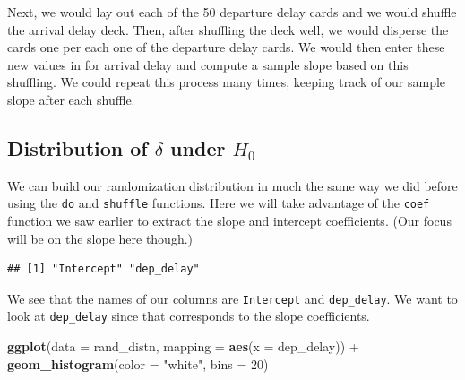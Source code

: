 \documentclass[]{tufte-book}
\newenvironment{Shaded}{\begin{snugshade}}{\end{snugshade}}
\newcommand{\KeywordTok}[1]{\textcolor[rgb]{0.13,0.29,0.53}{\textbf{{#1}}}}
\newcommand{\DataTypeTok}[1]{\textcolor[rgb]{0.13,0.29,0.53}{{#1}}}
\newcommand{\DecValTok}[1]{\textcolor[rgb]{0.00,0.00,0.81}{{#1}}}
\newcommand{\StringTok}[1]{\textcolor[rgb]{0.31,0.60,0.02}{{#1}}}
\newcommand{\NormalTok}[1]{{#1}}
\begin{document}
Next, we would lay out each of the 50 departure delay cards and we would
shuffle the arrival delay deck. Then, after shuffling the deck well, we
would disperse the cards one per each one of the departure delay cards.
We would then enter these new values in for arrival delay and compute a
sample slope based on this shuffling. We could repeat this process many
times, keeping track of our sample slope after each shuffle.

\subsection{\texorpdfstring{Distribution of \(\delta\) under
\(H_0\)}{Distribution of \textbackslash{}delta under H\_0}}\label{distribution-of-delta-under-h_0-2}

We can build our randomization distribution in much the same way we did
before using the \texttt{do} and \texttt{shuffle} functions. Here we
will take advantage of the \texttt{coef} function we saw earlier to
extract the slope and intercept coefficients. (Our focus will be on the
slope here though.)

\begin{Shaded}
\end{Shaded}

\begin{verbatim}
## [1] "Intercept" "dep_delay"
\end{verbatim}

We see that the names of our columns are \texttt{Intercept} and
\texttt{dep\_delay}. We want to look at \texttt{dep\_delay} since that
corresponds to the slope coefficients.

\begin{Shaded}
\begin{Highlighting}[]
\KeywordTok{ggplot}\NormalTok{(}\DataTypeTok{data =} \NormalTok{rand_distn, }\DataTypeTok{mapping =} \KeywordTok{aes}\NormalTok{(}\DataTypeTok{x =} \NormalTok{dep_delay)) +}
\StringTok{  }\KeywordTok{geom_histogram}\NormalTok{(}\DataTypeTok{color =} \StringTok{"white"}\NormalTok{, }\DataTypeTok{bins =} \DecValTok{20}\NormalTok{)}
\end{Highlighting}
\end{Shaded}
\end{document}
